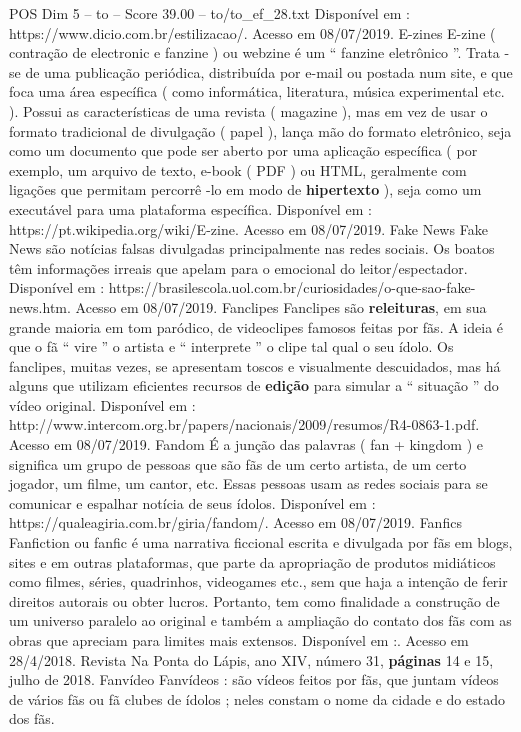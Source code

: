 \begin{textsample}{POS Dim 5 – to – Score 39.00 – to/to\_ef\_28.txt}
Disponível em : https://www.dicio.com.br/estilizacao/.
Acesso em 08/07/2019.
E-zines E-zine ( contração de electronic e fanzine ) ou webzine é um “ fanzine eletrônico ”.
Trata -se de uma publicação periódica, distribuída por e-mail ou postada num site, e que foca uma área específica ( como informática, literatura, música experimental etc. ).
Possui as características de uma revista ( magazine ), mas em vez de usar o formato tradicional de divulgação ( papel ), lança mão do formato eletrônico, seja como um documento que pode ser aberto por uma aplicação específica ( por exemplo, um arquivo de texto, e-book ( PDF ) ou HTML, geralmente com ligações que permitam percorrê -lo em modo de \textbf{hipertexto} ), seja como um executável para uma plataforma específica.
Disponível em : https://pt.wikipedia.org/wiki/E-zine.
Acesso em 08/07/2019.
Fake News Fake News são notícias falsas divulgadas principalmente nas redes sociais.
Os boatos têm informações irreais que apelam para o emocional do leitor/espectador.
Disponível em : https://brasilescola.uol.com.br/curiosidades/o-que-sao-fake-news.htm.
Acesso em 08/07/2019.
Fanclipes Fanclipes são \textbf{releituras}, em sua grande maioria em tom paródico, de videoclipes famosos feitas por fãs.
A ideia é que o fã “ vire ” o artista e “ interprete ” o clipe tal qual o seu ídolo.
Os fanclipes, muitas vezes, se apresentam toscos e visualmente descuidados, mas há alguns que utilizam eficientes recursos de \textbf{edição} para simular a “ situação ” do vídeo original.
Disponível em : http://www.intercom.org.br/papers/nacionais/2009/resumos/R4-0863-1.pdf.
Acesso em 08/07/2019.
Fandom É a junção das palavras ( fan + kingdom ) e significa um grupo de pessoas que são fãs de um certo artista, de um certo jogador, um filme, um cantor, etc.
Essas pessoas usam as redes sociais para se comunicar e espalhar notícia de seus ídolos.
Disponível em : https://qualeagiria.com.br/giria/fandom/.
Acesso em 08/07/2019.
Fanfics Fanfiction ou fanfic é uma narrativa ficcional escrita e divulgada por fãs em blogs, sites e em outras plataformas, que parte da apropriação de produtos midiáticos como filmes, séries, quadrinhos, videogames etc., sem que haja a intenção de ferir direitos autorais ou obter lucros.
Portanto, tem como finalidade a construção de um universo paralelo ao original e também a ampliação do contato dos fãs com as obras que apreciam para limites mais extensos.
Disponível em :.
Acesso em 28/4/2018.
Revista Na Ponta do Lápis, ano XIV, número 31, \textbf{páginas} 14 e 15, julho de 2018.
Fanvídeo Fanvídeos : são vídeos feitos por fãs, que juntam vídeos de vários fãs ou fã clubes de ídolos ; neles constam o nome da cidade e do estado dos fãs.

\end{textsample}
